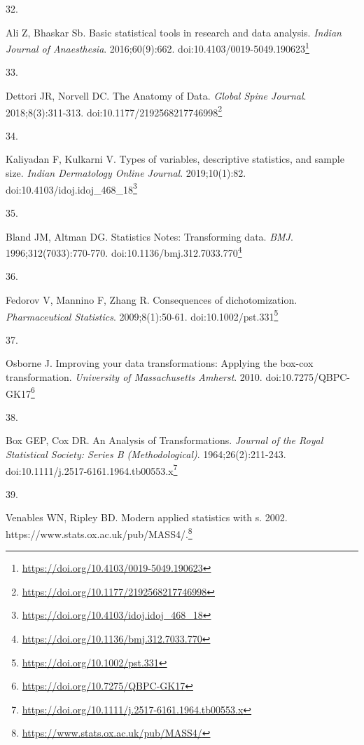 \documentclass[
]{book}
\newlength{\cslhangindent}
\newlength{\csllabelwidth}
\newlength{\cslentryspacingunit} %
\newenvironment{CSLReferences}[2] %
 {%
  \setlength{\parindent}{0pt}
  \ifodd #1
  \let\oldpar\par
  \def\par{\hangindent=\cslhangindent\oldpar}
  \fi
  \setlength{\parskip}{#2\cslentryspacingunit}
 }%
 {}
\newcommand{\CSLLeftMargin}[1]{\parbox[t]{\csllabelwidth}{#1}}
\newcommand{\CSLRightInline}[1]{\parbox[t]{\linewidth - \csllabelwidth}{#1}\break}
\renewcommand{\href}[2]{#2\footnote{\url{#1}}}
\begin{document}
\begin{CSLReferences}{0}{0}
\leavevmode{}%
\CSLLeftMargin{32. }%
\CSLRightInline{Ali Z, Bhaskar Sb. Basic statistical tools in research and data analysis. \emph{Indian Journal of Anaesthesia}. 2016;60(9):662. doi:\href{https://doi.org/10.4103/0019-5049.190623}{10.4103/0019-5049.190623}}

\leavevmode{}%
\CSLLeftMargin{33. }%
\CSLRightInline{Dettori JR, Norvell DC. The Anatomy of Data. \emph{Global Spine Journal}. 2018;8(3):311-313. doi:\href{https://doi.org/10.1177/2192568217746998}{10.1177/2192568217746998}}

\leavevmode{}%
\CSLLeftMargin{34. }%
\CSLRightInline{Kaliyadan F, Kulkarni V. Types of variables, descriptive statistics, and sample size. \emph{Indian Dermatology Online Journal}. 2019;10(1):82. doi:\href{https://doi.org/10.4103/idoj.idoj_468_18}{10.4103/idoj.idoj\_468\_18}}

\leavevmode{}%
\CSLLeftMargin{35. }%
\CSLRightInline{Bland JM, Altman DG. Statistics Notes: Transforming data. \emph{BMJ}. 1996;312(7033):770-770. doi:\href{https://doi.org/10.1136/bmj.312.7033.770}{10.1136/bmj.312.7033.770}}

\leavevmode{}%
\CSLLeftMargin{36. }%
\CSLRightInline{Fedorov V, Mannino F, Zhang R. Consequences of dichotomization. \emph{Pharmaceutical Statistics}. 2009;8(1):50-61. doi:\href{https://doi.org/10.1002/pst.331}{10.1002/pst.331}}

\leavevmode{}%
\CSLLeftMargin{37. }%
\CSLRightInline{Osborne J. Improving your data transformations: Applying the box-cox transformation. \emph{University of Massachusetts Amherst}. 2010. doi:\href{https://doi.org/10.7275/QBPC-GK17}{10.7275/QBPC-GK17}}

\leavevmode{}%
\CSLLeftMargin{38. }%
\CSLRightInline{Box GEP, Cox DR. An Analysis of Transformations. \emph{Journal of the Royal Statistical Society: Series B (Methodological)}. 1964;26(2):211-243. doi:\href{https://doi.org/10.1111/j.2517-6161.1964.tb00553.x}{10.1111/j.2517-6161.1964.tb00553.x}}

\leavevmode{}%
\CSLLeftMargin{39. }%
\CSLRightInline{Venables WN, Ripley BD. Modern applied statistics with s. 2002. \href{https://www.stats.ox.ac.uk/pub/MASS4/}{https://www.stats.ox.ac.uk/pub/MASS4/.}}


\end{CSLReferences}
\end{document}

